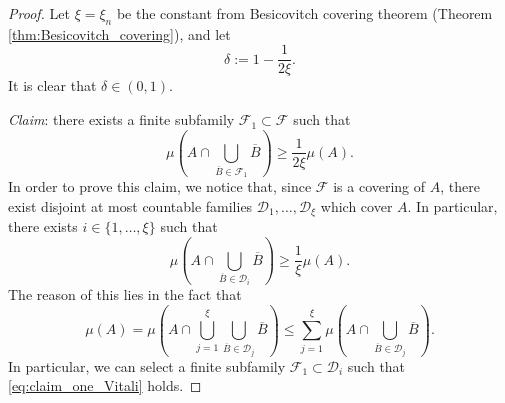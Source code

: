 \begin{proof}
Let $\xi = \xi_{n}$ be the constant from Besicovitch covering theorem (Theorem \ref{thm:Besicovitch_covering}), and let $$\delta := 1 - \frac{1}{2 \xi}.$$
It is clear that $\delta \in (0, 1)$.

{\em Claim}: there exists a finite subfamily $\mathcal{F}_{1} \subset \mathcal{F}$ such that
\begin{equation} \label{eq:claim_one_Vitali}
\mu \left ( A \cap \bigcup_{ \overline{B} \in \mathcal{F}_{1}} \overline{B} \right ) \ge \frac{1}{2 \xi} \mu(A).
\end{equation}
In order to prove this claim, we notice that, since $\mathcal{F}$ is a covering of $A$, there exist disjoint at most countable families $\mathcal{D}_{1}, \dots, \mathcal{D}_{\xi}$ which cover $A$. In particular, there exists $i \in \{1, \dots, \xi \}$ such that 
\begin{equation*}
\mu \left ( A \cap \bigcup_{ \overline{B} \in \mathcal{D}_{i}} \overline{B} \right ) \ge \frac{1}{\xi} \mu(A).
\end{equation*}
The reason of this lies in the fact that
\begin{equation*}
\mu(A) = \mu \left ( A \cap \bigcup_{j = 1}^{\xi} \bigcup_{ \overline{B} \in \mathcal{D}_{j}}  \overline{B} \right) \le \sum_{j = 1}^{\xi} \mu \left ( A \cap \bigcup_{ \overline{B} \in \mathcal{D}_{j}}  \overline{B} \right ).
\end{equation*}
In particular, we can select a finite subfamily $\mathcal{F}_{1} \subset \mathcal{D}_{i}$ such that \eqref{eq:claim_one_Vitali} holds.


\end{proof}
